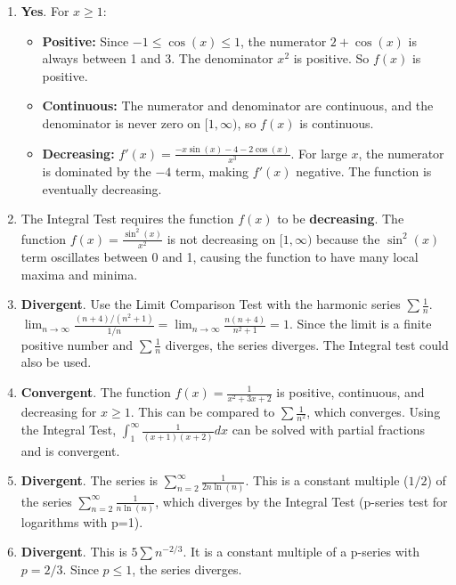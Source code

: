 \documentclass[12pt]{article}
\begin{document}
\begin{enumerate}
    \item \textbf{Yes}. For $x \ge 1$:
        \begin{itemize}
            \item \textbf{Positive:} Since $-1 \le \cos(x) \le 1$, the numerator $2+\cos(x)$ is always between 1 and 3. The denominator $x^2$ is positive. So $f(x)$ is positive.
            \item \textbf{Continuous:} The numerator and denominator are continuous, and the denominator is never zero on $[1, \infty)$, so $f(x)$ is continuous.
            \item \textbf{Decreasing:} $f'(x) = \frac{-x\sin(x) - 4 - 2\cos(x)}{x^3}$. For large $x$, the numerator is dominated by the $-4$ term, making $f'(x)$ negative. The function is eventually decreasing.
        \end{itemize}
        
    \item The Integral Test requires the function $f(x)$ to be \textbf{decreasing}. The function $f(x) = \frac{\sin^2(x)}{x^2}$ is not decreasing on $[1, \infty)$ because the $\sin^2(x)$ term oscillates between 0 and 1, causing the function to have many local maxima and minima.

    \item \textbf{Divergent}. Use the Limit Comparison Test with the harmonic series $\sum \frac{1}{n}$. $\lim_{n\to\infty} \frac{(n+4)/(n^2+1)}{1/n} = \lim_{n\to\infty} \frac{n(n+4)}{n^2+1} = 1$. Since the limit is a finite positive number and $\sum \frac{1}{n}$ diverges, the series diverges. The Integral test could also be used.

    \item \textbf{Convergent}. The function $f(x) = \frac{1}{x^2+3x+2}$ is positive, continuous, and decreasing for $x \ge 1$. This can be compared to $\sum \frac{1}{n^2}$, which converges. Using the Integral Test, $\int_1^\infty \frac{1}{(x+1)(x+2)} dx$ can be solved with partial fractions and is convergent.

    \item \textbf{Divergent}. The series is $\sum_{n=2}^{\infty} \frac{1}{2n \ln(n)}$. This is a constant multiple ($1/2$) of the series $\sum_{n=2}^{\infty} \frac{1}{n \ln(n)}$, which diverges by the Integral Test (p-series test for logarithms with p=1).
    
    \item \textbf{Divergent}. This is $5 \sum n^{-2/3}$. It is a constant multiple of a p-series with $p=2/3$. Since $p \le 1$, the series diverges.
    

\end{enumerate}
\end{document}
